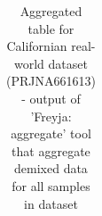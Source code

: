 \begin{landscape}
\begin{table}[ht!]
\begin{tabular}{l|l|l|l|l|l}
                \end{tabular}
                \caption{Aggregated table for Californian real-world dataset (PRJNA661613) - output of 'Freyja: aggregate' tool that aggregate demixed data for all samples in dataset} \label{tab:appendix:freyja}
                \end{table}
                \vfill
            \end{landscape}
        \clearpage

